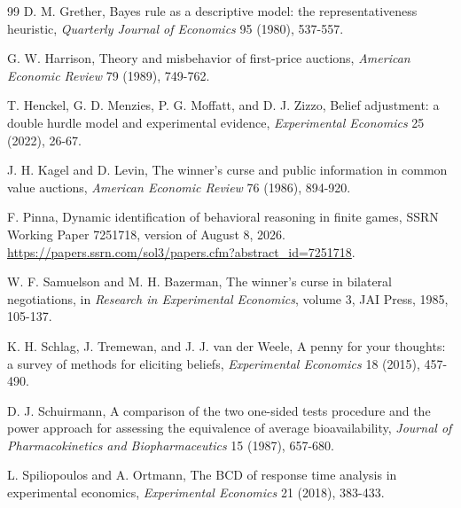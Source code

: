 \documentclass[11pt,a4paper]{article}
\begin{document}
\begin{thebibliography}{99}
 D. M. Grether, Bayes rule as a descriptive model: the representativeness heuristic, \emph{Quarterly Journal of Economics} 95 (1980), 537-557.

 G. W. Harrison, Theory and misbehavior of first-price auctions, \emph{American Economic Review} 79 (1989), 749-762.

 T. Henckel, G. D. Menzies, P. G. Moffatt, and D. J. Zizzo, Belief adjustment: a double hurdle model and experimental evidence, \emph{Experimental Economics} 25 (2022), 26-67.

 J. H. Kagel and D. Levin, The winner's curse and public information in common value auctions, \emph{American Economic Review} 76 (1986), 894-920.

 F. Pinna, Dynamic identification of behavioral reasoning in finite games, SSRN Working Paper 7251718, version of August 8, 2026. \url{https://papers.ssrn.com/sol3/papers.cfm?abstract_id=7251718}.

 W. F. Samuelson and M. H. Bazerman, The winner's curse in bilateral negotiations, in \emph{Research in Experimental Economics}, volume 3, JAI Press, 1985, 105-137.

 K. H. Schlag, J. Tremewan, and J. J. van der Weele, A penny for your thoughts: a survey of methods for eliciting beliefs, \emph{Experimental Economics} 18 (2015), 457-490.

 D. J. Schuirmann, A comparison of the two one-sided tests procedure and the power approach for assessing the equivalence of average bioavailability, \emph{Journal of Pharmacokinetics and Biopharmaceutics} 15 (1987), 657-680.

 L. Spiliopoulos and A. Ortmann, The BCD of response time analysis in experimental economics, \emph{Experimental Economics} 21 (2018), 383-433.

\end{thebibliography}
\end{document}
